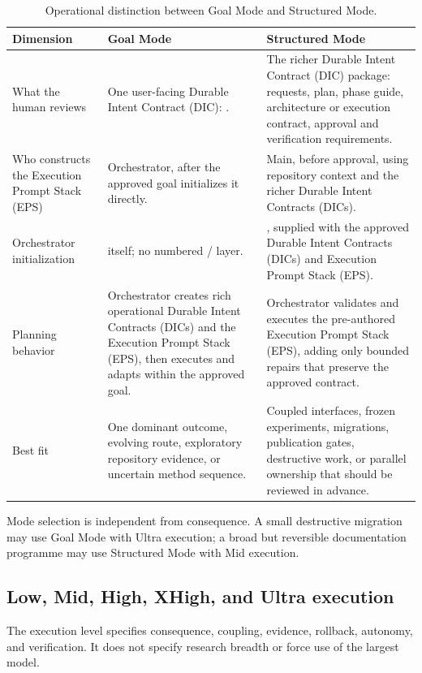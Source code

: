 \documentclass[11pt,a4paper]{article}
\newcommand{\code}[1]{\texttt{\detokenize{#1}}}
\begin{document}
\begin{table}[H]
\centering
\caption{Operational distinction between Goal Mode and Structured Mode.}
\begin{tabularx}{\textwidth}{P{0.22\textwidth}Y Y}
\toprule
\textbf{Dimension} & \textbf{Goal Mode} & \textbf{Structured Mode} \\
\midrule
What the human reviews & One user-facing Durable Intent Contract (DIC): \code{GOAL.md}. & The richer Durable Intent Contract (DIC) package: requests, plan, phase guide, architecture or execution contract, approval and verification requirements. \\
Who constructs the Execution Prompt Stack (EPS) & Orchestrator, after the approved goal initializes it directly. & Main, before approval, using repository context and the richer Durable Intent Contracts (DICs). \\
Orchestrator initialization & \code{GOAL.md} itself; no numbered \code{000}/\code{001} layer. & , supplied with the approved Durable Intent Contracts (DICs) and Execution Prompt Stack (EPS). \\
Planning behavior & Orchestrator creates rich operational Durable Intent Contracts (DICs) and the Execution Prompt Stack (EPS), then executes and adapts within the approved goal. & Orchestrator validates and executes the pre-authored Execution Prompt Stack (EPS), adding only bounded repairs that preserve the approved contract. \\
Best fit & One dominant outcome, evolving route, exploratory repository evidence, or uncertain method sequence. & Coupled interfaces, frozen experiments, migrations, publication gates, destructive work, or parallel ownership that should be reviewed in advance. \\
\bottomrule
\end{tabularx}
\end{table}

Mode selection is independent from consequence. A small destructive migration may use Goal Mode
with Ultra execution; a broad but reversible documentation programme may use Structured Mode with
Mid execution.

\subsection{Low, Mid, High, XHigh, and Ultra execution}\label{sec:scale-selection}

The execution level specifies consequence, coupling, evidence, rollback, autonomy, and verification.
It does not specify research breadth or force use of the largest model.
\end{document}
